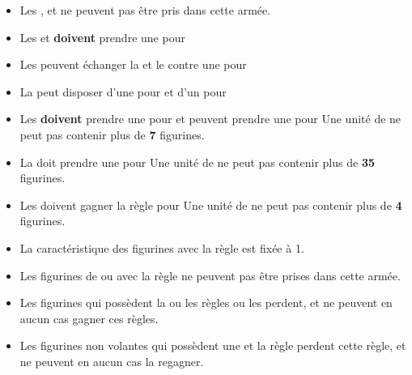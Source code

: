 \begin{multicols}{2}
\begin{itemize}[label={-}, leftmargin=*]
\item Les \greatvultures{}, \scarabswarms{} et \wingedreapers{} ne peuvent pas être pris dans cette armée.
\end{itemize}

\vspace*{\fill}\columnbreak

\begin{center}\armynewsubsection{\lordofthebarrowlegion}\end{center}

\begin{itemize}[label={-}, leftmargin=*]
\item Les \skeletons{} et \skeletonarchers{} \textbf{doivent} prendre une \ha{} pour \permodel{}

\item Les \skeletons{} peuvent échanger la \spear{} et le \shield{} contre une \halberd{} pour \permodel{}

\item La \skeletoncavalry{} peut disposer d'une \lance{} pour \permodel{} et d'un \barding{} pour \permodel{}

\item Les \skeletonchariots{} \textbf{doivent} prendre une \ha{} pour \permodel{} et peuvent prendre une \halberd{} pour \permodel{} Une unité de \skeletonchariots{} ne peut pas contenir plus de \textbf{7} figurines.

\item La \necropolisguard{} doit prendre une \ha{} pour \permodel{} Une unité de \necropolisguard{} ne peut pas contenir plus de \textbf{35} figurines.

\item Les \scarabswarms{} doivent gagner la règle \ethereal{} pour \permodel{} Une unité de \scarabswarms{} ne peut pas contenir plus de \textbf{4} figurines.

\item La caractéristique \risen{} des figurines avec la règle \ethereal{} est fixée à 1.

\item Les figurines de \monstrouscavalry{} ou avec la règle \largetarget{} ne peuvent pas être prises dans cette armée.

\item Les figurines qui possèdent la ou les règles \undergroundambush{} ou \scout{} les perdent, et ne peuvent en aucun cas gagner ces règles.

\item Les figurines non volantes qui possèdent une \ha{} et la règle \lighttroops{} perdent cette règle, et ne peuvent en aucun cas la regagner.
\end{itemize}

\vspace*{\fill}\end{multicols}

